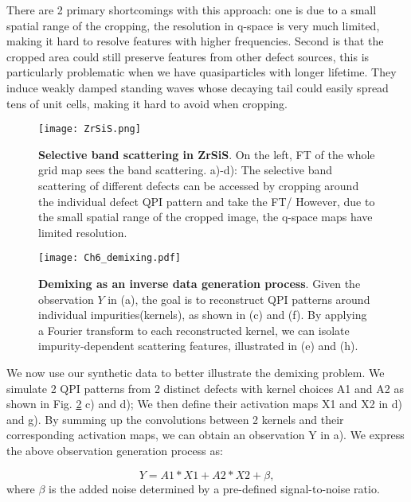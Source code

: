 There are 2 primary shortcomings with this approach: one is due to a small spatial range of the cropping, the resolution in q-space is very much limited, making it hard to resolve features with higher frequencies. Second is that the cropped area could still preserve features from other defect sources, this is particularly problematic when we have quasiparticles with longer lifetime. They induce weakly damped standing waves whose decaying tail could easily spread tens of unit cells, making it hard to avoid when cropping. 

\begin{figure}
	\texttt{[image: ZrSiS.png]} 
	\centering
	\caption[Selective band scattering in ZrSiS]{\textbf{Selective band scattering in ZrSiS}. On the left, \ac{FT} of the whole grid map sees the band scattering. a)-d): The selective band scattering of different defects can be accessed by cropping around the individual defect QPI pattern and take the \ac{FT}/ However, due to the small spatial range of the cropped image, the q-space maps have limited resolution.}
	\label{fig:ch6_ZrSiS}
\end{figure}

\begin{figure}
	\texttt{[image: Ch6\_demixing.pdf]} 
	\centering
	\caption[\textbf{Demixing as an inverse data generation process}]{\textbf{Demixing as an inverse data generation process}. Given the observation 
		$Y$ in (a), the goal is to reconstruct QPI patterns around individual impurities(kernels), as shown in (c) and (f). By applying a Fourier transform to each reconstructed kernel, we can isolate impurity-dependent scattering features, illustrated in (e) and (h).}
	\label{fig:ch6_demix}
\end{figure}

We now use our synthetic data to better illustrate the demixing problem. We simulate 2 \ac{QPI} patterns from 2 distinct defects with kernel choices A1 and A2 as shown in Fig. \ref{fig:ch6_demix} c) and d); We then define their activation maps X1 and X2 in d) and g). By summing up the convolutions between 2 kernels and their corresponding activation maps, we can obtain an observation Y in a). We express the above observation generation process as:

\begin{equation}
	Y = A1 * X1 + A2 * X2 + \beta, 
\end{equation}
where $\beta$ is the added noise determined by a pre-defined signal-to-noise ratio.

